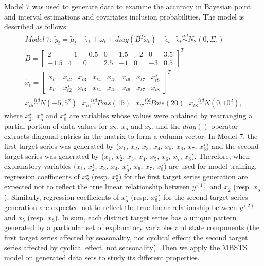 \documentclass[twoside,11pt]{article}
\begin{document}
Model $7$ was used to generate data to examine the accuracy in Bayesian point and interval estimations and covariates inclusion probabilities. The model is described as follows:
\begin{equation} \label{eq:model7}
\begin{gathered}
Model\ 7:\
\tilde{y}_t=\tilde{\mu}_t^\prime+\tilde{\tau}_t+\tilde{\omega}_t+diag(B^T\tilde{x}_t)+\tilde{\epsilon}_t \ \ \ \  \tilde{\epsilon}_t\stackrel{iid}\sim N_2(0,\Sigma_\epsilon)\\
B=\begin{bmatrix}
2 & -1 & -0.5 & 0 & 1.5 & -2 & 0 & 3.5\\
-1.5 & 4 & 0 & 2.5  & -1 & 0 & -3 & 0.5
\end{bmatrix}^T \\
\tilde{x}_t=\begin{bmatrix}
x_{t1} & x_{t2} & x_{t3}&  x_{t4}& x_{t5} & x_{t6}& x_{t7} & x_{t8}^\star\\
x_{t1} & x_{t2}^\star & x_{t3}&  x_{t4}& x_{t5} & x_{t6}& x_{t7} & x_{t8}
\end{bmatrix}^T\\
x_{t5}\stackrel{iid}\sim N(-5,5^2)\ \ \  x_{t6}\stackrel{iid}\sim Pois(15)\ \ \  x_{t7}\stackrel{iid}\sim Pois(20)\ \ \ x_{t8}\stackrel{iid}\sim N(0,10^2),
\end{gathered}
\end{equation}
where  $x_2^\star$, $x_5^\star$ and $x_8^\star$ are variables whose values were obtained by rearranging a partial portion of data values for $x_2$, $x_5$ and $x_8$, and the $diag()$ operator extracts diagonal entries in the matrix to form a column vector. In Model $7$, the first target series was generated by ($x_1$, $x_2$, $x_3$, $x_4$, $x_5$, $x_6$, $x_7$, $x_8^\star$) and the second target series was generated by ($x_1$, $x_2^\star$, $x_3$, $x_4$, $x_5$, $x_6$, $x_7$, $x_8$). Therefore, when explanatory variables ($x_1$, $x_2^\star$, $x_3$, $x_4$, $x_5^\star$, $x_6$, $x_7$, $x_8^\star$) are used for model training, regression coefficients of $x_2^\star$ (resp. $x_5^\star$) for the first target series generation are expected not to reflect the true linear relationship between $y^{(1)}$ and $x_2$ (resp.  $x_5$). Similarly, regression coefficients of $x_5^\star$ (resp. $x_8^\star$) for the second target series generation are expected not to reflect the true linear relationship between $y^{(2)}$ and $x_5$ (resp.  $x_8$).
In sum, each distinct target series has a unique pattern generated by a particular set of explanatory variables and state components (the first target series affected by seasonality, not cyclical effect; the second target series affected by cyclical effect, not seasonality).
Then we apply the MBSTS model on generated data sets to study its different properties.
\end{document}
